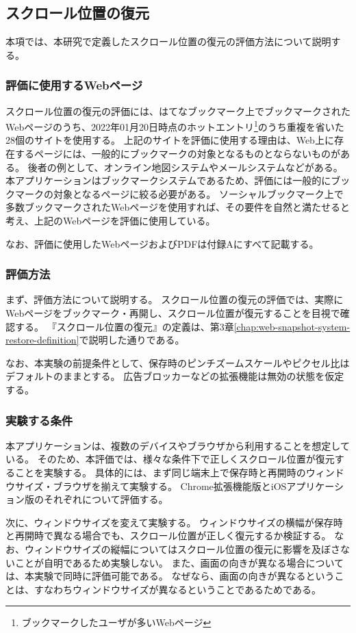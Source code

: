 \subsection{スクロール位置の復元}
本項では、本研究で定義したスクロール位置の復元の評価方法について説明する。

\subsubsection{評価に使用するWebページ}
スクロール位置の復元の評価には、はてなブックマーク上でブックマークされたWebページのうち、2022年01月20日時点のホットエントリ\footnote{ブックマークしたユーザが多いWebページ}のうち重複を省いた28個のサイトを使用する。
上記のサイトを評価に使用する理由は、Web上に存在するページには、一般的にブックマークの対象となるものとならないものがある。
後者の例として、オンライン地図システムやメールシステムなどがある。
本アプリケーションはブックマークシステムであるため、評価には一般的にブックマークの対象となるページに絞る必要がある。
ソーシャルブックマーク上で多数ブックマークされたWebページを使用すれば、その要件を自然と満たせると考え、上記のWebページを評価に使用している。

なお、評価に使用したWebページおよびPDFは付録Aにすべて記載する。

\subsubsection{評価方法}
まず、評価方法について説明する。
スクロール位置の復元の評価では、実際にWebページをブックマーク・再開し、スクロール位置が復元することを目視で確認する。
『スクロール位置の復元』の定義は、第3章\ref{chap:web-snapshot-system-restore-definition}で説明した通りである。

なお、本実験の前提条件として、保存時のピンチズームスケールやピクセル比はデフォルトのままとする。
広告ブロッカーなどの拡張機能は無効の状態を仮定する。

\subsubsection{実験する条件}
本アプリケーションは、複数のデバイスやブラウザから利用することを想定している。
そのため、本評価では、様々な条件下で正しくスクロール位置が復元することを実験する。
具体的には、まず同じ端末上で保存時と再開時のウィンドウサイズ・ブラウザを揃えて実験する。
Chrome拡張機能版とiOSアプリケーション版のそれぞれについて評価する。

次に、ウィンドウサイズを変えて実験する。
ウィンドウサイズの横幅が保存時と再開時で異なる場合でも、スクロール位置が正しく復元するか検証する。
なお、ウィンドウサイズの縦幅についてはスクロール位置の復元に影響を及ぼさないことが自明であるため実験しない。
また、画面の向きが異なる場合については、本実験で同時に評価可能である。
なぜなら、画面の向きが異なるということは、すなわちウィンドウサイズが異なるということであるためである。

